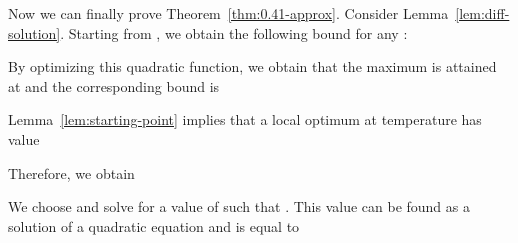 \documentclass{article}[11pt]
\renewenvironment{proof}{\noindent{\bf Proof}:~}{\\}
\begin{document}
\iffalse
\begin{proof}
 is a local optimum with respect to the objective function .
We denote  simply by . Let  be a global optimum and .
As we argued in the proof of Lemma~\ref{lem:drift-bound}, we have

and also

The fractional solutions here have the property that the fractional variables are constant
on each of 4 blocks: , ,  and .
More precisely, we have
\begin{itemize}
\item ,
\item .
\end{itemize}
We apply Lemma~\ref{lem:threshold2} which states that
,
where  are independent and uniformly random in .
This yields the following (after dropping some terms which are nonnegative):
\begin{itemize}
\item 
\item 
\end{itemize}
where we use . The first term in each bound is .
However, to make use of the remaining terms, we must add some terms on the left-hand side.
The terms we add are ;
it can be verified that both coefficients are nonnegative for .
Also, the coefficients are chosen so that they sum up to ,
the coefficient in front of  and . This implies the following, using submodularity:

Similarly, we get

Putting it all together, we get

where the simplification came about by using the elementary relations
  and .
Finally, submodularity implies 
and , so we get

again using .
Finally, we assume that  and , which means

\end{proof}
\fi

Now we can finally prove Theorem~\ref{thm:0.41-approx}. Consider Lemma~\ref{lem:diff-solution}.
Starting from , we obtain the following bound for any :

By optimizing this quadratic function, we obtain that the maximum is attained at
 and the corresponding bound is

Lemma~\ref{lem:starting-point} implies that a local optimum at temperature  has value
 
Therefore, we obtain
 
We choose  and solve for a value of  such that
. This value can be found as a solution of a quadratic equation
and is equal to
\end{document}
